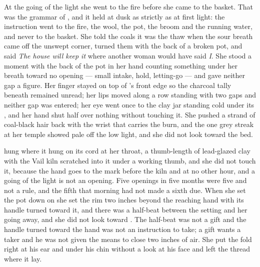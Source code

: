 At the going of the light she went to the fire before she came to the basket. That was the grammar of , and it held at dusk as strictly as at first light: the instruction went to the fire, the wool, the pot, the broom and the running water, and never to the basket. She told the coals it was the thaw when the sour breath came off the unswept corner, turned them with the back of a broken pot, and said \emph{The house will keep it} where another woman would have said \emph{I}. She stood a moment with the back of the pot in her hand counting something under her breath toward no opening --- small intake, hold, letting-go --- and gave neither gap a figure. Her finger stayed on top of 's front edge so the charcoal tally beneath remained unread; her lips moved along a row standing with two gaps and neither gap was entered; her eye went once to the clay jar standing cold under its , and her hand shut half over nothing without touching it. She pushed a strand of coal-black hair back with the wrist that carries the burn, and the one grey streak at her temple showed pale off the low light, and she did not look toward the bed.

 hung where it hung on its cord at her throat, a thumb-length of lead-glazed clay with the Vail kiln scratched into it under a working thumb, and she did not touch it, because the hand goes to the mark before the kiln and at no other hour, and a going of the light is not an opening. Five openings in five months were five and not a rule, and the fifth that morning had not made a sixth due. When she set the pot down on  she set the rim two inches beyond the reaching hand with its handle turned toward it, and there was a half-beat between the setting and her going away, and she did not look toward . The half-beat was not a gift and the handle turned toward the hand was not an instruction to take; a gift wants a taker and he was not given the means to close two inches of air. She put the fold right at his ear and under his chin without a look at his face and left the thread where it lay.


